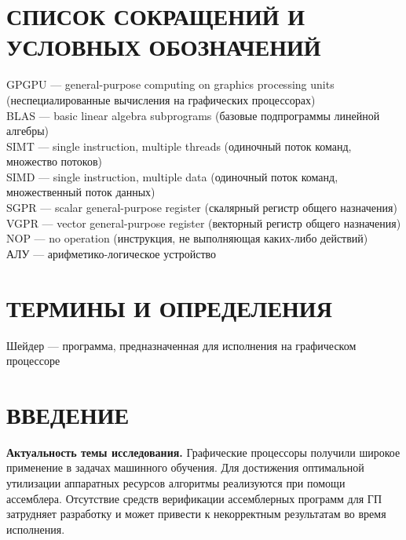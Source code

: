 \documentclass[a4paper,14pt]{extarticle}
\newcommand{\topic}[1]{\textbf{#1.}}
\begin{document}
\tableofcontents

\newpage
\section*{СПИСОК СОКРАЩЕНИЙ И УСЛОВНЫХ ОБОЗНАЧЕНИЙ}

GPGPU — general-purpose computing on graphics processing units (неспециалированные вычисления на графических процессорах)\\

BLAS — basic linear algebra subprograms (базовые подпрограммы линейной алгебры)\\

SIMT — single instruction, multiple threads (одиночный поток команд, множество потоков)\\

SIMD — single instruction, multiple data (одиночный поток команд, множественный поток данных)\\

SGPR — scalar general-purpose register (скалярный регистр общего назначения)\\

VGPR — vector general-purpose register (векторный регистр общего назначения)\\

NOP — no operation (инструкция, не выполняющая каких-либо действий)\\

АЛУ — арифметико-логическое устройство

\newpage
\section*{ТЕРМИНЫ И ОПРЕДЕЛЕНИЯ}

Шейдер — программа, предназначенная для исполнения на графическом процессоре

\newpage
\section*{ВВЕДЕНИЕ}

\topic{Актуальность темы исследования} Графические процессоры получили широкое применение
в задачах машинного обучения. Для достижения оптимальной утилизации аппаратных ресурсов
алгоритмы реализуются при помощи ассемблера. Отсутствие средств верификации ассемблерных
программ для ГП затрудняет разработку и может привести к некорректным результатам во время исполнения.
\end{document}
